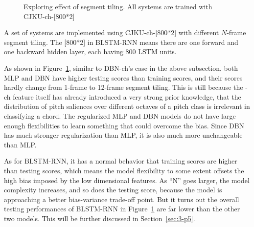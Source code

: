 \begin{figure}[htb]
	\caption{Exploring effect of segment tiling. All systems are trained with CJKU-ch-[800*2]}
	\label{fig:3-N-frame}
\end{figure}

A set of systems are implemented using CJKU-ch-[800*2] with different $N$-frame segment tiling. The [800*2] in BLSTM-RNN means there are one forward and one backward hidden layer, each having 800 LSTM units.

As shown in Figure~\ref{fig:3-N-frame}, similar to DBN-ch's case in the above subsection, both MLP and DBN have higher testing scores than training scores, and their scores hardly change from 1-frame to 12-frame segment tiling. This is still because the -ch feature itself has already introduced a very strong prior knowledge, that the distribution of pitch saliences over different octaves of a pitch class is irrelevant in classifying a chord. The regularized MLP and DBN models do not have large enough flexibilities to learn something that could overcome the bias. Since DBN has much stronger regularization than MLP, it is also much more unchangeable than MLP.

As for BLSTM-RNN, it has a normal behavior that training scores are higher than testing scores, which means the model flexibility to some extent offsets the high bias imposed by the low dimensional features. As ``N'' goes larger, the model complexity increases, and so does the testing score, because the model is approaching a better bias-variance trade-off point. But it turns out the overall testing performances of BLSTM-RNN in Figure~\ref{fig:3-N-frame} are far lower than the other two models. This will be further discussed in Section~\ref{sec:3-p5}.

